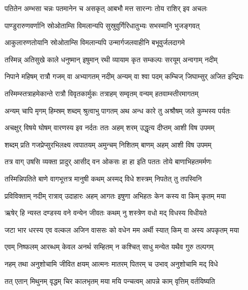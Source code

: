 \twolineshloka
{पतितेन अम्भसा चन्नः पतमानेन च असकृत्}
{आबभौ मत्त सारन्गः तोय राशिर् इव अचलः} %

\twolineshloka
{पाण्डुरारुणवर्णानि स्रोओताम्सि विमलान्यपि}
{सुस्रुवुर्गिरिधातुभ्यः सभस्मानि भुजङ्गवत्} %

\twolineshloka
{आकुलारुणतोयानि स्रोओताम्सि विमलान्यपि}
{उन्मार्गजलवाहीनि बभूवुर्जलदागमे} %

\twolineshloka
{तस्मिन्न् अतिसुखे काले धनुष्मान् इषुमान् रथी}
{व्यायाम कृत सम्कल्पः सरयूम् अन्वगाम् नदीम्} %

\twolineshloka
{निपाने महिषम् रात्रौ गजम् वा अभ्यागतम् नदीम्}
{अन्यम् वा श्वा पदम् कम्चिज् जिघाम्सुर् अजित इन्द्रियः} %

\twolineshloka
{तस्मिम्स्तत्राहमेकान्ते रात्रौ विवृतकार्मुकः}
{तत्राहम् सम्वृतम् वन्यम् हतवाम्स्तीरमागतम्} %

\twolineshloka
{अन्यम् चापि मृगम् हिम्स्रम् शब्दम् श्रुत्वाभु पागतम्}
{अथ अन्ध कारे तु अश्रौषम् जले कुम्भस्य पर्यतः} %

\twolineshloka
{अचक्षुर् विषये घोषम् वारणस्य इव नर्दतः}
{ततः अहम् शरम् उद्धृत्य दीप्तम् आशी विष उपमम्} %

\twolineshloka
{शब्दम् प्रति गजप्रेप्सुरभिलक्ष्य त्वपातयम्}
{अमुन्चम् निशितम् बाणम् अहम् आशी विष उपमम्} %

\twolineshloka
{तत्र वाग् उषसि व्यक्ता प्रादुर् आसीद् वन ओकसः}
{हा हा इति पततः तोये बाणाभिहतमर्मणः} %

\twolineshloka
{तस्मिन्निपतिते बाणे वागभूत्तत्र मानुषी}
{कथम् अस्मद् विधे शस्त्रम् निपतेत् तु तपस्विनि} %

\twolineshloka
{प्रविविक्ताम् नदीम् रात्राव् उदाहारः अहम् आगतः}
{इषुणा अभिहतः केन कस्य वा किम् कृतम् मया} %

\twolineshloka
{ऋषेर् हि न्यस्त दण्डस्य वने वन्येन जीवतः}
{कथम् नु शस्त्रेण वधो मद् विधस्य विधीयते} %

\twolineshloka
{जटा भार धरस्य एव वल्कल अजिन वाससः}
{को वधेन मम अर्थी स्यात् किम् वा अस्य अपकृतम् मया} %

\twolineshloka
{एवम् निष्फलम् आरब्धम् केवल अनर्थ सम्हितम्}
{न कश्चित् साधु मन्येत यथैव गुरु तल्पगम्} %

\twolineshloka
{नहम् तथा अनुशोचामि जीवित क्षयम् आत्मनः}
{मातरम् पितरम् च उभाव् अनुशोचामि मद् विधे} %

\twolineshloka
{तत् एतान् मिथुनम् वृद्धम् चिर कालभृतम् मया}
{मयि पन्चत्वम् आपन्ने काम् वृत्तिम् वर्तयिष्यति} %

